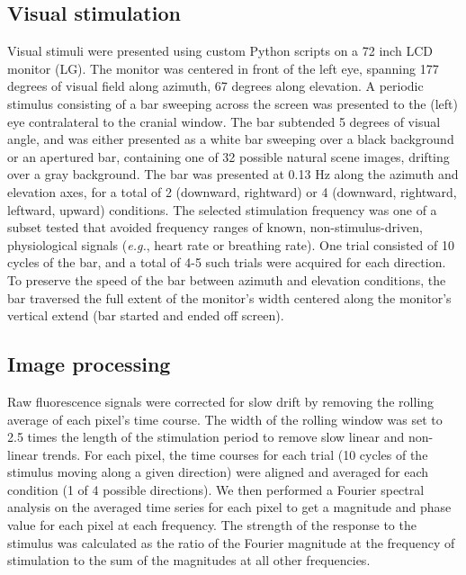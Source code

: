 \subsection{Visual stimulation}
Visual stimuli were presented using custom Python scripts on a 72 inch LCD monitor (LG). The monitor was centered in front of the left eye, spanning 177 degrees of visual field along azimuth, 67 degrees along elevation. A periodic stimulus consisting of a bar sweeping across the screen \cite{Kalatsky2003, Marshel2011} was presented to the (left) eye contralateral to the cranial window. The bar subtended 5 degrees of visual angle, and was either presented as a white bar sweeping over a black background or an apertured bar, containing one of 32 possible natural scene images, drifting over a gray background. The bar was presented at 0.13 Hz along the azimuth and elevation axes, for a total of 2 (downward, rightward) or 4 (downward, rightward, leftward, upward) conditions. The selected stimulation frequency was one of a subset tested that avoided frequency ranges of known, non-stimulus-driven, physiological signals (\textit{e.g.}, heart rate or breathing rate). One trial consisted of 10 cycles of the bar, and a total of 4-5 such trials were acquired for each direction. To preserve the speed of the bar between azimuth and elevation conditions, the bar traversed the full extent of the monitor's width centered along the monitor's vertical extend (bar started and ended off screen). 

\subsection{Image processing}
Raw fluorescence signals were corrected for slow drift by removing the rolling average of each pixel’s time course. The width of the rolling window was set to 2.5 times the length of the stimulation period to remove slow linear and non-linear trends. For each pixel, the time courses for each trial (10 cycles of the stimulus moving along a given direction) were aligned and averaged for each condition (1 of 4 possible directions). We then performed a Fourier spectral analysis on the averaged time series for each pixel to get a magnitude and phase value for each pixel at each frequency. The strength of the response to the stimulus was calculated as the ratio of the Fourier magnitude at the frequency of stimulation to the sum of the magnitudes at all other frequencies\cite{Kalatsky2003, Marshel2011, Juavinett2017}.

